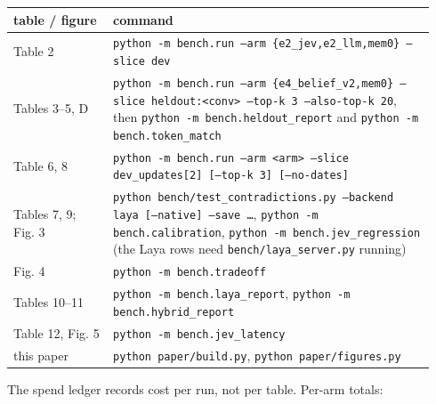 \documentclass[11pt]{article}
\begin{document}
\begingroup\scriptsize
\begin{longtable}{>{\raggedright\arraybackslash}p{0.225\linewidth}>{\raggedright\arraybackslash}p{0.712\linewidth}}
\toprule
\textbf{table / figure} & \textbf{command} \\
\midrule
\endhead
Table 2 & \texttt{python -m bench.run --arm \{e2\_\allowbreak{}\allowbreak{}jev,e2\_\allowbreak{}\allowbreak{}llm,mem0\} --slice dev} \\
Tables 3--5, D & \texttt{python -m bench.run --arm \{e4\_\allowbreak{}\allowbreak{}belief\_\allowbreak{}\allowbreak{}v2,mem0\} --slice heldout:\textless{}conv\textgreater{} --top-k 3 --also-top-k 20}, then \texttt{python -m bench.heldout\_\allowbreak{}\allowbreak{}report} and \texttt{python -m bench.token\_\allowbreak{}\allowbreak{}match} \\
Table 6, 8 & \texttt{python -m bench.run --arm \textless{}arm\textgreater{} --slice dev\_\allowbreak{}\allowbreak{}updates[2] [--top-k 3] [--no-dates]} \\
Tables 7, 9; Fig. 3 & \texttt{python bench/test\_\allowbreak{}\allowbreak{}contradictions.py --backend laya [--native] --save \ldots{}}, \texttt{python -m bench.calibration}, \texttt{python -m bench.jev\_\allowbreak{}\allowbreak{}regression} (the Laya rows need \texttt{bench/laya\_\allowbreak{}\allowbreak{}server.py} running) \\
Fig. 4 & \texttt{python -m bench.tradeoff} \\
Tables 10--11 & \texttt{python -m bench.laya\_\allowbreak{}\allowbreak{}report}, \texttt{python -m bench.hybrid\_\allowbreak{}\allowbreak{}report} \\
Table 12, Fig. 5 & \texttt{python -m bench.jev\_\allowbreak{}\allowbreak{}latency} \\
this paper & \texttt{python paper/build.py}, \texttt{python paper/figures.py} \\
\bottomrule
\end{longtable}
\endgroup
The spend ledger records cost per run, not per table. Per-arm totals:
\end{document}
